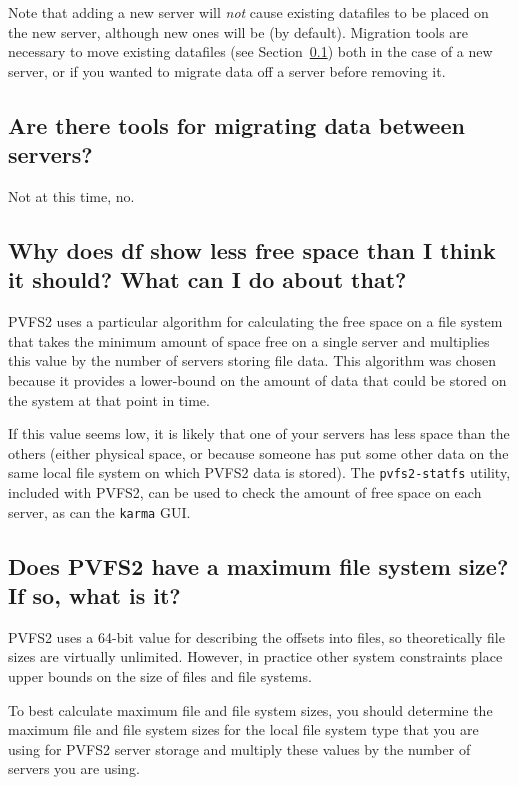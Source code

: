 \documentclass[11pt,letterpaper]{article}
\begin{document}
Note that adding a new server will \emph{not} cause existing datafiles to be
placed on the new server, although new ones will be (by default).  Migration
tools are necessary to move existing datafiles (see
Section~\ref{sec:migration}) both in the case of a new server, or if you
wanted to migrate data off a server before removing it.

\subsection{Are there tools for migrating data between servers?}
\label{sec:migration}

Not at this time, no.

\subsection{Why does df show less free space than I think it should? What
            can I do about that?}

PVFS2 uses a particular algorithm for calculating the free space on a file
system that takes the minimum amount of space free on a single server and
multiplies this value by the number of servers storing file data.
%
This algorithm was chosen because it provides a lower-bound on the amount of
data that could be stored on the system at that point in time.

If this value seems low, it is likely that one of your servers has less space
than the others (either physical space, or because someone has put some other
data on the same local file system on which PVFS2 data is stored).  The
\texttt{pvfs2-statfs} utility, included with PVFS2, can be used to check the
amount of free space on each server, as can the \texttt{karma} GUI.

\subsection{Does PVFS2 have a maximum file system size? If so, what is it?}

PVFS2 uses a 64-bit value for describing the offsets into files, so
theoretically file sizes are virtually unlimited.  However, in practice other
system constraints place upper bounds on the size of files and file systems.

To best calculate maximum file and file system sizes, you should determine the
maximum file and file system sizes for the local file system type that you are
using for PVFS2 server storage and multiply these values by the number of
servers you are using.
\end{document}
